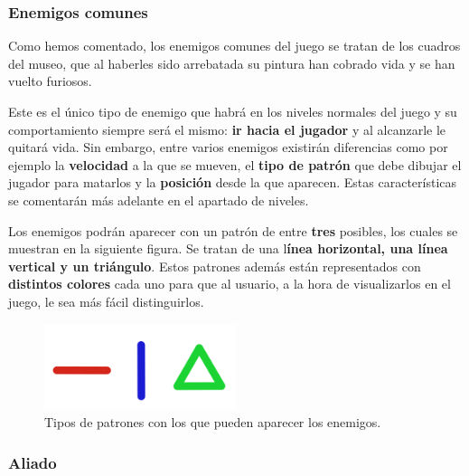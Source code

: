 \subsubsection{Enemigos comunes}

Como hemos comentado, los enemigos comunes del juego se tratan de los cuadros del museo, que al haberles sido arrebatada su pintura han cobrado vida y se han vuelto furiosos.

\vspace{0.5cm}

Este es el único tipo de enemigo que habrá en los niveles normales del juego y su comportamiento siempre será el mismo: \textbf{ir hacia el jugador} y al alcanzarle le quitará vida. Sin embargo, entre varios enemigos existirán diferencias como por ejemplo la \textbf{velocidad} a la que se mueven, el \textbf{tipo de patrón} que debe dibujar el jugador para matarlos y la\textbf{ posición} desde la que aparecen. Estas características se comentarán más adelante en el apartado de niveles.

\vspace{0.5cm}

Los enemigos podrán aparecer con un patrón de entre \textbf{tres} posibles, los cuales se muestran en la siguiente figura. Se tratan de una l\textbf{ínea horizontal, una línea vertical y un triángulo}. Estos patrones además están representados con \textbf{distintos colores} cada uno para que al usuario, a la hora de visualizarlos en el juego, le sea más fácil distinguirlos.

\vspace{0.5cm}

\begin{figure}[htbp]
\centering
  \includegraphics[width=0.5\textwidth]{archivos/patterns.png}
  \caption{Tipos de patrones con los que pueden aparecer los enemigos.}
  \label{fig:patterns_enemies}
\end{figure}

\vspace{0.5cm}

\subsubsection{Aliado}


